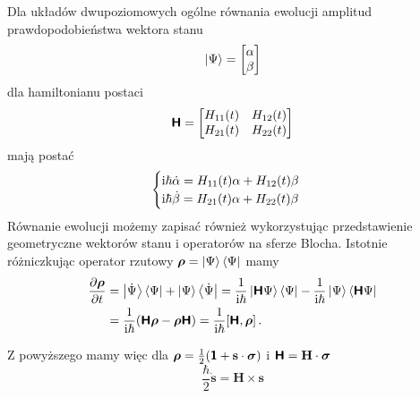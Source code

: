 \documentclass{myclass}
\begin{document}
Dla układów dwupoziomowych ogólne równania ewolucji amplitud prawdopodobieństwa wektora stanu
\begin{equation*}
    \ket{\Psi} = \mqty[\alpha \\ \beta]
\end{equation*}
dla hamiltonianu postaci
\begin{equation*}
    \oper{H} = \mqty[H_{11}(t) & H_{12}(t) \\ H_{21}(t) & H_{22}(t)]
\end{equation*}
mają postać
\begin{equation*}
    \begin{cases}
        \mathrm{i}\hbar\dot{\alpha} = H_{11}(t)\alpha + H_{12}(t)\beta\\
        \mathrm{i}\hbar\dot{\beta}  = H_{21}(t)\alpha + H_{22}(t)\beta
    \end{cases}
\end{equation*}
Równanie ewolucji możemy zapisać również wykorzystując przedstawienie geometryczne wektorów stanu i
operatorów na sferze Blocha. Istotnie różniczkując operator rzutowy \(\boldsymbol{\mathsf{\rho}} =
\ket{\Psi}\bra{\Psi}\) mamy
\begin{equation*}
    \begin{split}
        \pdv{\boldsymbol{\mathsf{\rho}}}{t} &= \ket{\dot{\Psi}}\bra{\Psi} + \ket{\Psi}\bra{\dot{\Psi}} = \frac{1}{\mathrm{i}\hbar}\ket{\boldsymbol{\mathsf{H}}\Psi}\bra{\Psi} - \frac{1}{\mathrm{i}\hbar}\ket{\Psi}\bra{\boldsymbol{\mathsf{H}}\Psi}\\
        &=\frac{1}{\mathrm{i}\hbar}(\boldsymbol{\mathsf{H}}\boldsymbol{\mathsf{\rho}}-\boldsymbol{\mathsf{\rho}}\boldsymbol{\mathsf{H}}) = \frac{1}{\mathrm{i}\hbar}[\boldsymbol{\mathsf{H}},\boldsymbol{\mathsf{\rho}}]\,.
    \end{split}
\end{equation*}

Z powyższego mamy więc dla \(\boldsymbol{\mathsf{\rho}} = \frac{1}{2}(\boldsymbol{\mathsf{1}} +
\mathbf{s}\cdot\boldsymbol{\sigma})\) i \(\boldsymbol{\mathsf{H}} = \mathbf{H}\cdot\boldsymbol{\sigma}\)
\begin{equation*}
    \frac{\hbar}{2}\dot{\mathbf{s}} = \mathbf{H}\times\mathbf{s}
\end{equation*}
\end{document}
